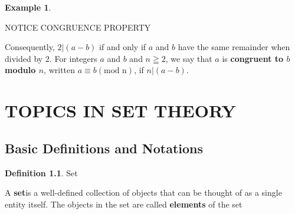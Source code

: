 \documentclass{book}
\theoremstyle{definition}
\newtheorem{definition}{Definition}[section]
\newtheorem{example}{Example}[definition]
\theoremstyle{remark}
\begin{document}
\begin{example}
\begin{tcolorbox}
NOTICE CONGRUENCE PROPERTY

Consequently, $2 | (a -b)$ if and only if $a$ and $b$ have the same remainder when divided by $2$. For integers $a$ and $b$ and $n \geqq 2$, we say that $a$ is {\bf congruent to $b$ modulo $n$}, written $a \equiv b (\text{mod n})$, if $n | (a - b)$. \\
\end{tcolorbox}
\end{example} 













































\newpage
\chapter{TOPICS IN SET THEORY}
\section{Basic Definitions and Notations}

\begin{definition}
Set \\

    \begin{tcolorbox}
        A {\bf set}\footnotemark is a well-defined collection of objects that can be thought of as a single entity itself. The objects in the set are called {\bf elements} of the set \\
    \end{tcolorbox}
    
\end{definition}
\end{document}

